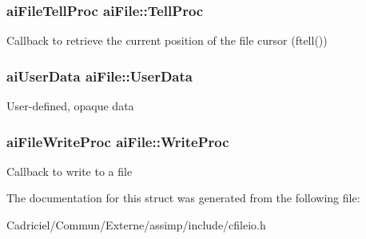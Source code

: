 \subsubsection[{\texorpdfstring{Tell\+Proc}{TellProc}}]{\setlength{\rightskip}{0pt plus 5cm}ai\+File\+Tell\+Proc ai\+File\+::\+Tell\+Proc}\hypertarget{structai_file_aaf2d88a3b2fcbdacf51119658283d27e}{}\label{structai_file_aaf2d88a3b2fcbdacf51119658283d27e}
Callback to retrieve the current position of the file cursor (ftell()) 
\subsubsection[{\texorpdfstring{User\+Data}{UserData}}]{\setlength{\rightskip}{0pt plus 5cm}ai\+User\+Data ai\+File\+::\+User\+Data}\hypertarget{structai_file_aec528fa18f4755fe4f28d604fde28aad}{}\label{structai_file_aec528fa18f4755fe4f28d604fde28aad}
User-\/defined, opaque data 
\subsubsection[{\texorpdfstring{Write\+Proc}{WriteProc}}]{\setlength{\rightskip}{0pt plus 5cm}ai\+File\+Write\+Proc ai\+File\+::\+Write\+Proc}\hypertarget{structai_file_ab9fca3a62e34a33592c13a6f31db7d1d}{}\label{structai_file_ab9fca3a62e34a33592c13a6f31db7d1d}
Callback to write to a file 

The documentation for this struct was generated from the following file\+:\begin{DoxyCompactItemize}
\item 
Cadriciel/\+Commun/\+Externe/assimp/include/cfileio.\+h\end{DoxyCompactItemize}
